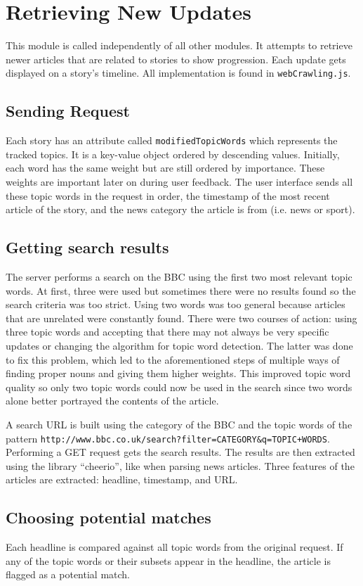\documentclass[11pt,titlepage]{report}
\begin{document}
\section{Retrieving New Updates}
This module is called independently of all other modules. It attempts to retrieve newer articles that are related to stories to show progression. Each update gets displayed on a story's timeline. All implementation is found in \lstinline|webCrawling.js|.
\subsection{Sending Request}
Each story has an attribute called \lstinline|modifiedTopicWords| which represents the tracked topics. It is a key-value object ordered by descending values. Initially, each word has the same weight but are still ordered by importance. These weights are important later on during user feedback. The user interface sends all these topic words in the request in order, the timestamp of the most recent article of the story, and the news category the article is from (i.e. news or sport).
\subsection{Getting search results}
The server performs a search on the BBC using the first two most relevant topic words. At first, three were used but sometimes there were no results found so the search criteria was too strict. Using two words was too general because articles that are unrelated were constantly found. There were two courses of action: using three topic words and accepting that there may not always be very specific updates or changing the algorithm for topic word detection. The latter was done to fix this problem, which led to the aforementioned steps of multiple ways of finding proper nouns and giving them higher weights. This improved topic word quality so only two topic words could now be used in the search since two words alone better portrayed the contents of the article.

A search URL is built using the category of the BBC and the topic words of the pattern \lstinline|http://www.bbc.co.uk/search?filter=CATEGORY&q=TOPIC+WORDS|. Performing a GET request gets the search results. The results are then extracted using the library ``cheerio'', like when parsing news articles. Three features of the articles are extracted: headline, timestamp, and URL.
\subsection{Choosing potential matches}
Each headline is compared against all topic words from the original request. If any of the topic words or their subsets appear in the headline, the article is flagged as a potential match. 
\end{document}
